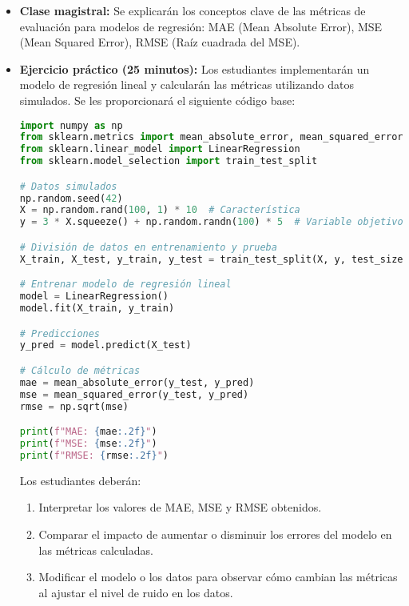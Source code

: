 \documentclass[a4,11pt]{aleph-notas}
\begin{document}
\begin{itemize}[leftmargin=*]
    \item \textbf{Clase magistral:}  
    Se explicarán los conceptos clave de las métricas de evaluación para modelos de regresión: MAE (Mean Absolute Error), MSE (Mean Squared Error), RMSE (Raíz cuadrada del MSE).

    \item \textbf{Ejercicio práctico (25 minutos):}  
    Los estudiantes implementarán un modelo de regresión lineal y calcularán las métricas utilizando datos simulados. Se les proporcionará el siguiente código base:

\begin{pycodigo}
\begin{lstlisting}[language=Python]
import numpy as np
from sklearn.metrics import mean_absolute_error, mean_squared_error
from sklearn.linear_model import LinearRegression
from sklearn.model_selection import train_test_split

# Datos simulados
np.random.seed(42)
X = np.random.rand(100, 1) * 10  # Característica
y = 3 * X.squeeze() + np.random.randn(100) * 5  # Variable objetivo

# División de datos en entrenamiento y prueba
X_train, X_test, y_train, y_test = train_test_split(X, y, test_size=0.2, random_state=42)

# Entrenar modelo de regresión lineal
model = LinearRegression()
model.fit(X_train, y_train)

# Predicciones
y_pred = model.predict(X_test)

# Cálculo de métricas
mae = mean_absolute_error(y_test, y_pred)
mse = mean_squared_error(y_test, y_pred)
rmse = np.sqrt(mse)

print(f"MAE: {mae:.2f}")
print(f"MSE: {mse:.2f}")
print(f"RMSE: {rmse:.2f}")
\end{lstlisting}
\end{pycodigo}

    Los estudiantes deberán:
    \begin{enumerate}
        \item Interpretar los valores de MAE, MSE y RMSE obtenidos.
        \item Comparar el impacto de aumentar o disminuir los errores del modelo en las métricas calculadas.
        \item Modificar el modelo o los datos para observar cómo cambian las métricas al ajustar el nivel de ruido en los datos.
    \end{enumerate}
\end{itemize}
\end{document}
